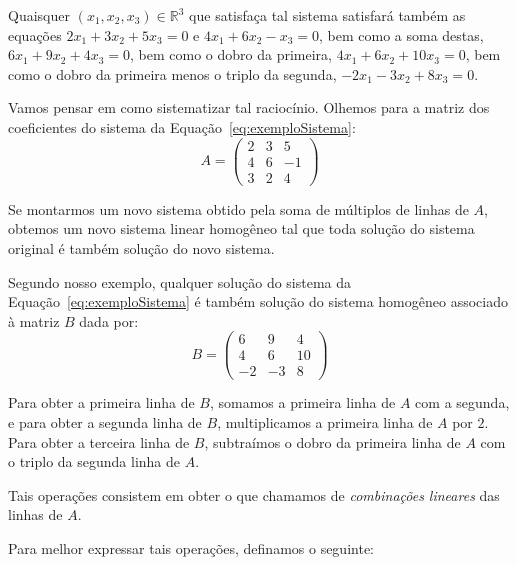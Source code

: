 Quaisquer $(x_1, x_2, x_3)\in \mathbb R^3$ que satisfaça tal sistema satisfará também as equações $2x_1 + 3x_2 + 5x_3 = 0$ e $4x_1 + 6x_2 - x_3 = 0$, bem como a soma destas, $6x_1 + 9x_2 + 4x_3 = 0$, bem como o dobro da primeira, $4x_1 + 6x_2 + 10x_3 = 0$, bem como o dobro da primeira menos o triplo da segunda, $-2x_1 - 3x_2 + 8x_3 = 0$.

Vamos pensar em como sistematizar tal raciocínio. Olhemos para a matriz dos coeficientes do sistema da Equação~\eqref{eq:exemploSistema}:
\begin{equation*}
    A = \begin{pmatrix}
        2 & 3 & 5 \\
        4 & 6 & -1 \\
        3 & 2 & 4
    \end{pmatrix}
\end{equation*}

Se montarmos um novo sistema obtido pela soma de múltiplos de linhas de $A$, obtemos um novo sistema linear homogêneo tal que toda solução do sistema original é também solução do novo sistema.

Segundo nosso exemplo, qualquer solução do sistema da Equação~\eqref{eq:exemploSistema} é também solução do sistema homogêneo associado à matriz $B$ dada por:
\begin{equation*}
    B = \begin{pmatrix}
        6 & 9 & 4 \\
        4 & 6 & 10 \\
        -2 & -3 & 8
    \end{pmatrix}
\end{equation*}

Para obter a primeira linha de $B$, somamos a primeira linha de $A$ com a segunda, e para obter a segunda linha de $B$, multiplicamos a primeira linha de $A$ por $2$.
Para obter a terceira linha de $B$, subtraímos o dobro da primeira linha de $A$ com o triplo da segunda linha de $A$.

Tais operações consistem em obter o que chamamos de \emph{combinações lineares} das linhas de $A$.

Para melhor expressar tais operações, definamos o seguinte:

